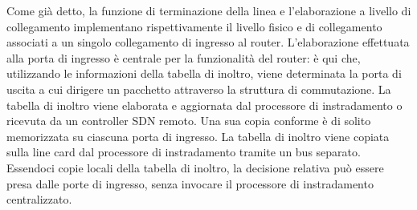 Come già detto, la funzione di terminazione della linea e l'elaborazione a livello di collegamento implementano rispettivamente il livello fisico e di collegamento associati a un singolo collegamento di ingresso al router. L'elaborazione effettuata alla porta di ingresso è centrale per la funzionalità del router: è qui che, utilizzando le informazioni della tabella di inoltro, viene determinata la porta di uscita a cui dirigere un pacchetto attraverso la struttura di commutazione. La tabella di inoltro viene elaborata e aggiornata dal processore di instradamento o ricevuta da un controller SDN remoto. Una sua copia conforme è di solito memorizzata su ciascuna porta di ingresso. La tabella di inoltro viene copiata sulla line card dal processore di instradamento tramite un bus separato. Essendoci copie locali della tabella di inoltro, la decisione relativa può essere presa dalle porte di ingresso, senza invocare il processore di instradamento centralizzato.

